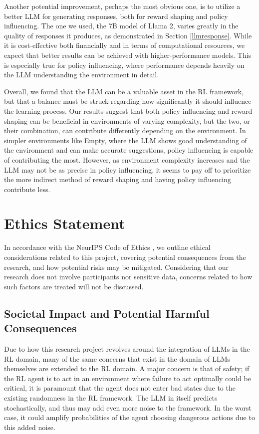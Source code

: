 \documentclass[conference]{IEEEtran}
\begin{document}
Another potential improvement, perhaps the most obvious one, is to utilize a better LLM for generating responses, both for reward shaping and policy influencing. The one we used, the 7B model of Llama 2, varies greatly in the quality of responses it produces, as demonstrated in Section \ref{llmresponse}. While it is cost-effective both financially and in terms of computational resources, we expect that better results can be achieved with higher-performance models. This is especially true for policy influencing, where performance depends heavily on the LLM understanding the environment in detail.

Overall, we found that the LLM can be a valuable asset in the RL framework, but that a balance must be struck regarding how significantly it should influence the learning process. Our results suggest that both policy influencing and reward shaping can be beneficial in environments of varying complexity, but the two, or their combination, can contribute differently depending on the environment. In simpler environments like Empty, where the LLM shows good understanding of the environment and can make accurate suggestions, policy influencing is capable of contributing the most. However, as environment complexity increases and the LLM may not be as precise in policy influencing, it seems to pay off to prioritize the more indirect method of reward shaping and having policy influencing contribute less.

\section*{Ethics Statement}

In accordance with the NeurIPS Code of Ethics \cite{ethics}, we outline ethical considerations related to this project, covering potential consequences from the research, and how potential risks may be mitigated. Considering that our research does not involve participants nor sensitive data, concerns related to how such factors are treated will not be discussed.

\subsection*{Societal Impact and Potential Harmful Consequences}

Due to how this research project revolves around the integration of LLMs in the RL domain, many of the same concerns that exist in the domain of LLMs themselves are extended to the RL domain. A major concern is that of safety; if the RL agent is to act in an environment where failure to act optimally could be critical, it is paramount that the agent does not enter bad states due to the existing randomness in the RL framework. The LLM in itself predicts stochastically, and thus may add even more noise to the framework. In the worst case, it could amplify probabilities of the agent choosing dangerous actions due to this added noise.
\end{document}
